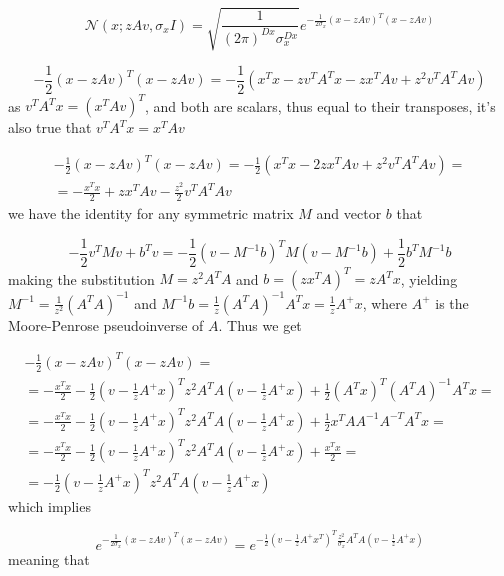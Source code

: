 \documentclass{paper}
\begin{document}
\begin{equation} 
\mathcal{N}(x;zAv,\sigma_x I) = \sqrt{\frac{1}{(2\pi)^{Dx} \sigma_x^{Dx}}}e^{-\frac{1}{2 \sigma_x} (x-zAv)^T(x-zAv)}
\end{equation}

\begin{equation} 
-\frac{1}{2} (x-zAv)^T(x-zAv) = -\frac{1}{2} (x^Tx - zv^TA^Tx - zx^TAv + z^2 v^TA^TAv)
\end{equation}
%
as $v^TA^Tx = (x^TAv)^T$, and both are scalars, thus equal to their transposes, it's also true that $v^TA^Tx = x^TAv$

\begin{equation} 
\begin{split}
-\frac{1}{2} (x-zAv)^T(x-zAv) = -\frac{1}{2} (x^Tx - 2zx^TAv + z^2 v^TA^TAv) = \\
= -\frac{x^Tx}{2} + zx^TAv -\frac{z^2}{2} v^TA^TAv
\end{split}
\end{equation}
%
we have the identity for any symmetric matrix $M$ and vector $b$ that

\begin{equation} 
-\frac{1}{2} v^T M v + b^Tv = -\frac{1}{2} (v - M^{-1}b)^T M (v - M^{-1}b) + \frac{1}{2}b^T M^{-1} b
\end{equation}
%
making the substitution $M = z^2A^TA$ and $b = (zx^TA)^T=zA^Tx$, yielding $M^{-1} = \frac{1}{z^2}(A^TA)^{-1}$ and $M^{-1} b = \frac{1}{z}(A^TA)^{-1}A^Tx = \frac{1}{z}A^{+}x$, where $A^{+}$ is the Moore-Penrose pseudoinverse of $A$. Thus we get

\begin{equation}
\begin{split}
-\frac{1}{2} (x-zAv)^T(x-zAv) = \\
= -\frac{x^Tx}{2} -\frac{1}{2} (v - \frac{1}{z}A^{+}x)^T z^2A^TA (v - \frac{1}{z}A^{+}x)  + \frac{1}{2} (A^Tx)^T (A^TA)^{-1}A^Tx = \\
=-\frac{x^Tx}{2} -\frac{1}{2} (v - \frac{1}{z}A^{+}x)^T z^2A^TA (v - \frac{1}{z}A^{+}x)  + \frac{1}{2} x^T A A^{-1} A^{-T} A^T x = \\
= -\frac{x^Tx}{2} -\frac{1}{2} (v - \frac{1}{z}A^{+}x)^T z^2A^TA (v - \frac{1}{z}A^{+}x)  + \frac{x^Tx}{2} = \\
= -\frac{1}{2} (v - \frac{1}{z}A^{+}x)^T z^2A^TA (v - \frac{1}{z}A^{+}x)
\end{split}
\end{equation}
%
which implies

\begin{equation}
e^{-\frac{1}{2 \sigma_x} (x-zAv)^T(x-zAv)} = e^{-\frac{1}{2} (v - \frac{1}{z}A^{+}x^T)^T \frac{z^2}{\sigma_x} A^TA(v - \frac{1}{z}A^{+}x)}
\end{equation}
% 
meaning that
\end{document}
